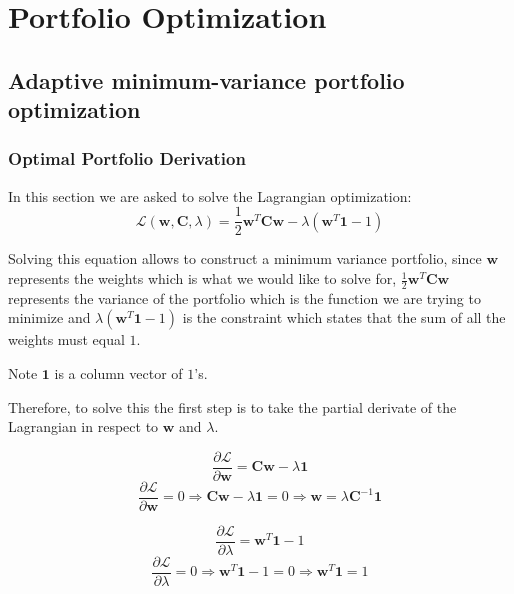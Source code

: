 \chapter{Portfolio Optimization}
\section{Adaptive minimum-variance portfolio optimization}
\subsection{Optimal Portfolio Derivation}

In this section we are asked to solve the Lagrangian optimization: 
\[\mathcal{L}(\mathbf{w}, \mathbf{C}, \lambda) = \frac{1}{2}\mathbf{w}^T\mathbf{C}\mathbf{w} -  \lambda(\mathbf{w}^T \mathbf{1} - 1) \] 

Solving this equation allows to construct a minimum variance portfolio, since $\mathbf{w}$ represents the weights which is what we would like to solve for, $\frac{1}{2}\mathbf{w}^T\mathbf{C}\mathbf{w}$ represents the variance of the portfolio which is the function we are trying to minimize and $\lambda(\mathbf{w}^T \mathbf{1} - 1)$ is the constraint which states that the sum of all the weights must equal $1$. 

Note $\mathbf{1}$ is a column vector of $1$'s.

Therefore, to solve this the first step is to take the partial derivate of the Lagrangian in respect to $\mathbf{w}$ and $\lambda$.  

\begin{equation}
    \frac{\partial \mathcal{L}}{\partial \mathbf{w}} = \mathbf{C}\mathbf{w} - \lambda\mathbf{1}
\end{equation}  
\begin{equation}
    \frac{\partial \mathcal{L}}{\partial \mathbf{w}} = 0 \Rightarrow \mathbf{C}\mathbf{w} - \lambda\mathbf{1} = 0 \Rightarrow \mathbf{w} = \lambda\mathbf{C}^{-1}\mathbf{1}
    \label{eq:part_3:w_result}
\end{equation}  
  
\begin{equation}
    \frac{\partial \mathcal{L}}{\partial \lambda} = \mathbf{w}^T\mathbf{1} - 1
\end{equation}  
\begin{equation}
    \frac{\partial \mathcal{L}}{\partial \lambda} = 0 \Rightarrow \mathbf{w}^T\mathbf{1} - 1 = 0 \Rightarrow \mathbf{w}^T\mathbf{1} = 1
    \label{eq:part_3:lamda_diff}
\end{equation} 

